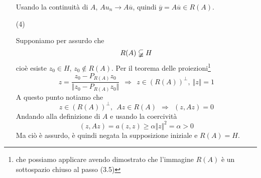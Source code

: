 \begin{dimostrazione}
\begin{itemize}
              Usando la continuità di $A$, $Au_{n}\rightarrow A\overline{u}$, quindi $\overline{y} =A\overline{u} \in R(A)$.

        \item[(4)]

              Supponiamo per assurdo che
              \begin{equation*}
                  R(A) \varsubsetneqq H
              \end{equation*}
              cioè esiste $z_{0} \in H$, $z_{0} \notin R(A)$. Per il teorema delle proiezioni\footnote{che possiamo applicare avendo dimostrato che l'immagine $R(A)$ è un sottospazio chiuso al passo (3.5)}
              \begin{equation*}
                  z=\frac{z_{0} -P_{R(A)} z_{0}}{\Vert z_{0} -P_{R(A)} z_{0}\Vert } \ \ \Rightarrow \ \ z\in (R(A))^{\perp },\ \Vert z\Vert =1
              \end{equation*}
              A questo punto notiamo che
              \begin{equation*}
                  z\in (R(A))^{\perp },\ \ Az\in R(A) \ \ \Rightarrow \ \ (z,Az) =0
              \end{equation*}
              Andando alla definizione di $A$ e usando la coercività
              \begin{equation*}
                  (z,Az) =a(z,z) \geq \alpha \Vert z\Vert ^{2} =\alpha  >0
              \end{equation*}
              Ma ciò è assurdo, è quindi negata la supposizione iniziale e $R(A) =H$.
    \end{itemize}
\end{dimostrazione}